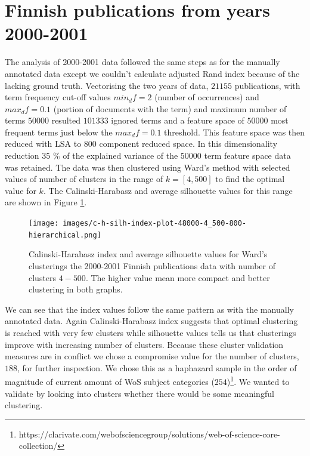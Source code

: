 \section{Finnish publications from years 2000-2001}
The analysis of 2000-2001 data followed the same steps as for 
the manually annotated data except we couldn't calculate adjusted
Rand index because of the lacking ground truth.
Vectorising the two years of data, $21155$ publications, with term 
frequency cut-off values $min_df=2$
(number of occurrences) and $max_df=0.1$ (portion of documents with
the term) and maximum number of terms $50000$ resulted $101333$ 
ignored terms and a feature space of $50000$ most frequent terms 
just below the $max_df=0.1$ threshold. 
This feature space was then reduced with LSA to $800$ component 
reduced space. In this dimensionality reduction 35 \% of the 
explained variance of the $50000$ term feature space data was retained.
The data was then clustered using Ward's method with selected 
values of number of clusters in the range of $k=[4,500]$ to find 
the optimal value for $k$.
The Calinski-Harabasz and average silhouette values for this range
are shown in Figure \ref{fig:ch-silh-2000-h}.
\begin{figure}[htp]
  \begin{center}    
\texttt{[image: images/c-h-silh-index-plot-48000-4\_500-800-hierarchical.png]}
    \caption{Calinski-Harabasz index and average silhouette values 
    for Ward's clusterings the 2000-2001 Finnish publications data
    with number of clusters $4-500$. The higher value mean more 
    compact and better clustering in both graphs.}
    \label{fig:ch-silh-2000-h}
  \end{center}
\end{figure}
We can see that the index values follow the same pattern as with 
the manually annotated data. Again Calinski-Harabasz index 
suggests that optimal clustering is reached with very few clusters
while silhouette values tells us that clusterings improve with 
increasing number of clusters. Because these cluster validation 
measures are in conflict we chose a compromise value for the 
number of clusters, $188$, for further inspection. We chose this 
as a haphazard sample in the order of magnitude of current amount 
of WoS subject categories 
($254$)\footnote{https://clarivate.com/webofsciencegroup/solutions/web-of-science-core-collection/}.
We wanted to validate by looking into clusters whether there would
be some meaningful clustering.

